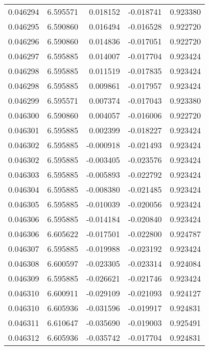 \begin{tabular}{lrrrr}
0.046294    &  6.595571 &  0.018152 & -0.018741 &             0.923380 \\
0.046295    &  6.590860 &  0.016494 & -0.016528 &             0.922720 \\
0.046296    &  6.590860 &  0.014836 & -0.017051 &             0.922720 \\
0.046297    &  6.595885 &  0.014007 & -0.017704 &             0.923424 \\
0.046298    &  6.595885 &  0.011519 & -0.017835 &             0.923424 \\
0.046298    &  6.595885 &  0.009861 & -0.017957 &             0.923424 \\
0.046299    &  6.595571 &  0.007374 & -0.017043 &             0.923380 \\
0.046300    &  6.590860 &  0.004057 & -0.016006 &             0.922720 \\
0.046301    &  6.595885 &  0.002399 & -0.018227 &             0.923424 \\
0.046302    &  6.595885 & -0.000918 & -0.021493 &             0.923424 \\
0.046302    &  6.595885 & -0.003405 & -0.023576 &             0.923424 \\
0.046303    &  6.595885 & -0.005893 & -0.022792 &             0.923424 \\
0.046304    &  6.595885 & -0.008380 & -0.021485 &             0.923424 \\
0.046305    &  6.595885 & -0.010039 & -0.020056 &             0.923424 \\
0.046306    &  6.595885 & -0.014184 & -0.020840 &             0.923424 \\
0.046306    &  6.605622 & -0.017501 & -0.022800 &             0.924787 \\
0.046307    &  6.595885 & -0.019988 & -0.023192 &             0.923424 \\
0.046308    &  6.600597 & -0.023305 & -0.023314 &             0.924084 \\
0.046309    &  6.595885 & -0.026621 & -0.021746 &             0.923424 \\
0.046310    &  6.600911 & -0.029109 & -0.021093 &             0.924127 \\
0.046310    &  6.605936 & -0.031596 & -0.019917 &             0.924831 \\
0.046311    &  6.610647 & -0.035690 & -0.019003 &             0.925491 \\
0.046312    &  6.605936 & -0.035742 & -0.017704 &             0.924831 \\

\end{tabular}
